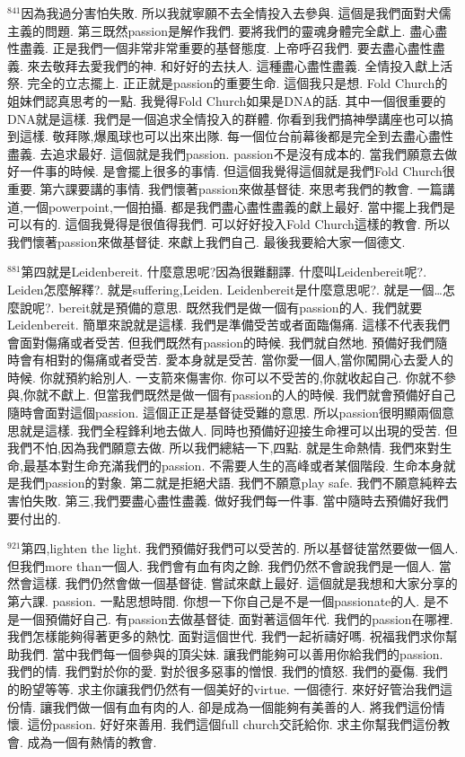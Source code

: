 \documentclass{book}
\begin{document}
$^{841}$因為我過分害怕失敗.
所以我就寧願不去全情投入去參與.
這個是我們面對犬儒主義的問題.
第三既然passion是解作我們.
要將我們的靈魂身體完全獻上.
盡心盡性盡義.
正是我們一個非常非常重要的基督態度.
上帝呼召我們.
要去盡心盡性盡義.
來去敬拜去愛我們的神.
和好好的去扶人.
這種盡心盡性盡義.
全情投入獻上活祭.
完全的立志擺上.
正正就是passion的重要生命.
這個我只是想.
Fold Church的姐妹們認真思考的一點.
我覺得Fold Church如果是DNA的話.
其中一個很重要的DNA就是這樣.
我們是一個追求全情投入的群體.
你看到我們搞神學講座也可以搞到這樣.
敬拜隊,爆風球也可以出來出隊.
每一個位台前幕後都是完全到去盡心盡性盡義.
去追求最好.
這個就是我們passion.
passion不是沒有成本的.
當我們願意去做好一件事的時候.
是會擺上很多的事情.
但這個我覺得這個就是我們Fold Church很重要.
第六課要講的事情.
我們懷著passion來做基督徒.
來思考我們的教會.
一篇講道,一個powerpoint,一個拍攝.
都是我們盡心盡性盡義的獻上最好.
當中擺上我們是可以有的.
這個我覺得是很值得我們.
可以好好投入Fold Church這樣的教會.
所以我們懷著passion來做基督徒.
來獻上我們自己.
最後我要給大家一個德文.

$^{881}$第四就是Leidenbereit.
什麼意思呢?因為很難翻譯.
什麼叫Leidenbereit呢?.
Leiden怎麼解釋?.
就是suffering,Leiden.
Leidenbereit是什麼意思呢?.
就是一個…怎麼說呢?.
bereit就是預備的意思.
既然我們是做一個有passion的人.
我們就要Leidenbereit.
簡單來說就是這樣.
我們是準備受苦或者面臨傷痛.
這樣不代表我們會面對傷痛或者受苦.
但我們既然有passion的時候.
我們就自然地.
預備好我們隨時會有相對的傷痛或者受苦.
愛本身就是受苦.
當你愛一個人,當你闖開心去愛人的時候.
你就預約給別人.
一支箭來傷害你.
你可以不受苦的,你就收起自己.
你就不參與,你就不獻上.
但當我們既然是做一個有passion的人的時候.
我們就會預備好自己隨時會面對這個passion.
這個正正是基督徒受難的意思.
所以passion很明顯兩個意思就是這樣.
我們全程鋒利地去做人.
同時也預備好迎接生命裡可以出現的受苦.
但我們不怕,因為我們願意去做.
所以我們總結一下,四點.
就是生命熱情.
我們來對生命,最基本對生命充滿我們的passion.
不需要人生的高峰或者某個階段.
生命本身就是我們passion的對象.
第二就是拒絕犬語.
我們不願意play safe.
我們不願意純粹去害怕失敗.
第三,我們要盡心盡性盡義.
做好我們每一件事.
當中隨時去預備好我們要付出的.

$^{921}$第四,lighten the light.
我們預備好我們可以受苦的.
所以基督徒當然要做一個人.
但我們more than一個人.
我們會有血有肉之餘.
我們仍然不會說我們是一個人.
當然會這樣.
我們仍然會做一個基督徒.
嘗試來獻上最好.
這個就是我想和大家分享的第六課.
passion.
一點思想時間.
你想一下你自己是不是一個passionate的人.
是不是一個預備好自己.
有passion去做基督徒.
面對著這個年代.
我們的passion在哪裡.
我們怎樣能夠得著更多的熱忱.
面對這個世代.
我們一起祈禱好嗎.
祝福我們求你幫助我們.
當中我們每一個參與的頂尖妹.
讓我們能夠可以善用你給我們的passion.
我們的情.
我們對於你的愛.
對於很多惡事的憎恨.
我們的憤怒.
我們的憂傷.
我們的盼望等等.
求主你讓我們仍然有一個美好的virtue.
一個德行.
來好好管治我們這份情.
讓我們做一個有血有肉的人.
卻是成為一個能夠有美善的人.
將我們這份情懷.
這份passion.
好好來善用.
我們這個full church交託給你.
求主你幫我們這份教會.
成為一個有熱情的教會.
\end{document}
